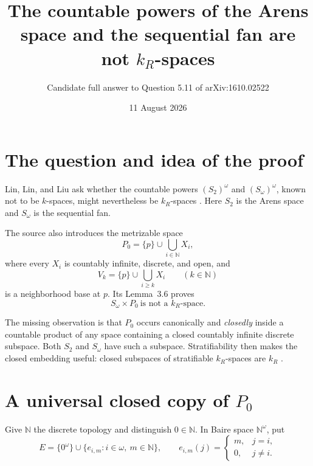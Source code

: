\documentclass[11pt]{article}
\title{The countable powers of the Arens space and the sequential fan are not \texorpdfstring{$k_R$}{kR}-spaces}
\author{Candidate full answer to Question 5.11 of arXiv:1610.02522}
\date{11 August 2026}
\newcommand{\N}{\mathbb N}
\begin{document}
\maketitle

\noindent{}

\section{The question and idea of the proof}

Lin, Lin, and Liu ask whether the countable powers $(S_2)^\omega$ and
$(S_\omega)^\omega$, known not to be $k$-spaces, might nevertheless be
$k_R$-spaces \cite[Question~5.11]{LLL}.  Here $S_2$ is the Arens space and
$S_\omega$ is the sequential fan.

The source also introduces the metrizable space
\[
  P_0=\{p\}\cup\bigcup_{i\in\N}X_i,
\]
where every $X_i$ is countably infinite, discrete, and open, and
\[
  V_k=\{p\}\cup\bigcup_{i\ge k}X_i\qquad(k\in\N)
\]
is a neighborhood base at $p$.  Its Lemma~3.6 proves
\[
                 S_\omega\times P_0\ \text{is not a }k_R\text{-space}.
\tag{1}\label{eq:obstruction}
\]

The missing observation is that $P_0$ occurs canonically and \emph{closedly}
inside a countable product of any space containing a closed countably
infinite discrete subspace.  Both $S_2$ and $S_\omega$ have such a
subspace.  Stratifiability then makes the closed embedding useful: closed
subspaces of stratifiable $k_R$-spaces are $k_R$ \cite[Prop.~5.11]{BG}.

\section{A universal closed copy of \texorpdfstring{$P_0$}{P0}}

Give $\N$ the discrete topology and distinguish $0\in\N$.  In Baire
space $\N^\omega$, put
\[
 E=\{0^\omega\}\cup\{e_{i,m}:i\in\omega,\ m\in\N\},
 \qquad
 e_{i,m}(j)=
 \begin{cases}
 m,&j=i,\\
 0,&j\ne i.
 \end{cases}
\]
\end{document}

